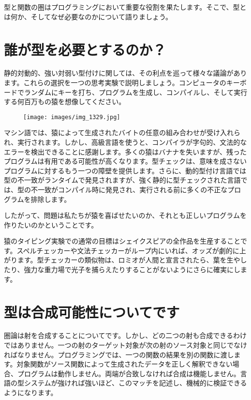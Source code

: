 
\lettrine[lhang=0.17]{型}{と関数}の圏はプログラミングにおいて重要な役割を果たします。そこで、型とは何か、そしてなぜ必要なのかについて語りましょう。

\section{誰が型を必要とするのか？}

静的対動的、強い対弱い型付けに関しては、その利点を巡って様々な議論があります。これらの選択を一つの思考実験で説明しましょう。コンピュータのキーボードでランダムにキーを打ち、プログラムを生成し、コンパイルし、そして実行する何百万もの猿を想像してください。

\begin{figure}[H]
  \centering
  \texttt{[image: images/img\_1329.jpg]}
\end{figure}

\noindent
マシン語では、猿によって生成されたバイトの任意の組み合わせが受け入れられ、実行されます。しかし、高級言語を使うと、コンパイラが字句的、文法的なエラーを検出できることに感謝します。多くの猿はバナナを失いますが、残ったプログラムは有用である可能性が高くなります。型チェックは、意味を成さないプログラムに対するもう一つの障壁を提供します。さらに、動的型付け言語では型の不一致がランタイムで発見されますが、強く静的に型チェックされた言語では、型の不一致がコンパイル時に発見され、実行される前に多くの不正なプログラムを排除します。

したがって、問題は私たちが猿を喜ばせたいのか、それとも正しいプログラムを作りたいのかということです。

猿のタイピング実験での通常の目標はシェイクスピアの全作品を生産することです。スペルチェッカーや文法チェッカーがループ内にいれば、オッズが劇的に上がります。型チェッカーの類似物は、ロミオが人間と宣言されたら、葉を生やしたり、強力な重力場で光子を捕らえたりすることがないようにさらに確実にします。

\section{型は合成可能性についてです}

圏論は射を合成することについてです。しかし、どの二つの射も合成できるわけではありません。一つの射のターゲット対象が次の射のソース対象と同じでなければなりません。プログラミングでは、一つの関数の結果を別の関数に渡します。対象関数がソース関数によって生成されたデータを正しく解釈できない場合、プログラムは動作しません。両端が合致しなければ合成は機能しません。言語の型システムが強ければ強いほど、このマッチを記述し、機械的に検証できるようになります。


